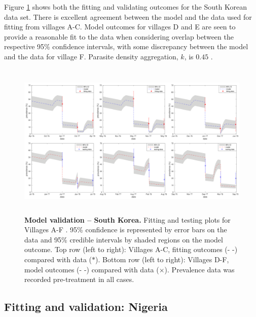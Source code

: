 Figure \ref{Fig3} shows both the fitting and validating outcomes for the South Korean data set. There is excellent agreement between the model and the data used for fitting from villages A-C. Model outcomes for villages D and E are seen to provide a reasonable fit to the data when considering overlap between the respective 95\% confidence intervals, with some discrepancy between the model and the data for village F. Parasite density aggregation, $k$, is $0.45$ \cite{Chai,Guyatt}.

\begin{figure}[!ht]
\includegraphics[height=7.5cm]{Project/Figures/STH/Fig3.pdf}
\caption[Model fitting and validation (South Korea).]{{\bf Model validation -- South Korea.}
Fitting and testing plots for Villages A-F \cite{Seo}. 95\% confidence is represented by error bars on the data and 95\% credible intervals by shaded regions on the model outcome. Top row (left to right): Villages A-C, fitting outcomes (- -) compared with data ($*$). Bottom row (left to right): Villages D-F, model outcomes (- -) compared with data ($\times$). Prevalence data was recorded pre-treatment in all cases.}
\label{Fig3}
\end{figure} 

\subsection{Fitting and validation: Nigeria}


